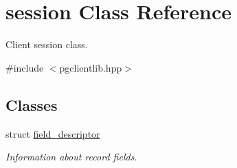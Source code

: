 \hypertarget{classsession}{}\section{session Class Reference}
\label{classsession}


Client session class.  




{\ttfamily \#include $<$pgclientlib.\+hpp$>$}

\subsection*{Classes}
\begin{DoxyCompactItemize}
\item 
struct \hyperlink{structsession_1_1field__descriptor}{field\+\_\+descriptor}
\begin{DoxyCompactList}\small\item\em Information about record fields. \end{DoxyCompactList}\end{DoxyCompactItemize}
